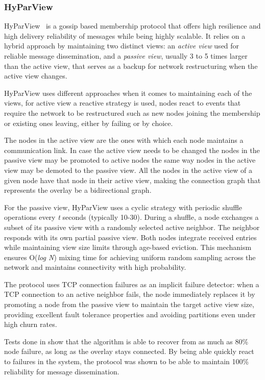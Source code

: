\subsubsection{HyParView}\label{subsec:hyparview}

HyParView~\cite{hyparview} is a gossip based membership protocol that offers high
resilience and high delivery reliability of messages while being highly scalable.
It relies on a hybrid approach by maintaining two distinct views: an \textit{active view}
used for reliable message dissemination, and a \textit{passive view},
usually 3 to 5 times larger than the active view,
that serves as a backup for network restructuring when the active view changes.

HyParView uses different approaches when it comes to maintaining each of the views,
for active view a reactive strategy is used, nodes react to events that require 
the network to be restructured such as new nodes joining the membership or
existing ones leaving, either by failing or by choice.

The nodes in the active view are the ones with which each node maintains a
communication link. In case the active view needs to be changed the nodes in
the passive view may be promoted to active nodes the same way nodes in the
active view may be demoted to the passive view. All the nodes in the active
view of a given node have that node in their active view, making the connection
graph that represents the overlay be a bidirectional graph.

For the passive view, HyParView uses a cyclic strategy with periodic shuffle operations
every \textit{t} seconds (typically 10-30). During a shuffle, a node exchanges
a subset of its passive view with a randomly selected active neighbor.
The neighbor responds with its own partial passive view. Both nodes
integrate received entries while maintaining view size limits through age-based eviction.
This mechanism ensures O(\textit{log N}) mixing time for achieving uniform random sampling
across the network and maintains connectivity with high probability.

The protocol uses TCP connection failures as an implicit failure detector: when a TCP
connection to an active neighbor fails, the node immediately replaces it by promoting
a node from the passive view to maintain the target active view size, providing
excellent fault tolerance properties and avoiding partitions even under high churn rates.

Tests done in \cite{hyparview} show that the algorithm is able to recover from as much as 80\%
node failure, as long as the overlay stays connected. By being able quickly react to failures
in the system, the protocol was shown to be able to maintain 100\% reliability 
for message dissemination.


